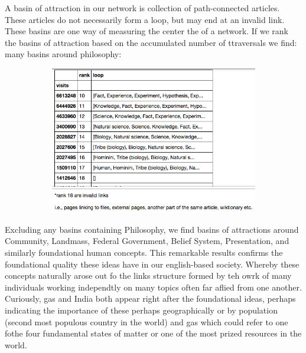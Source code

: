 \documentclass[twoside]{article}
\newcommand{\red}[1]{{\leavevmode\color{sred}{#1}}} %
\begin{document}
A basin of attraction in our network is collection of path-connected articles. These articles do not necessarily form a loop, but may end at an invalid link. These basins are one way of measuring the center the of a network. If we rank the basins of attraction based on the accumulated number of ttraversals we find: many basins around philosophy: 

\begin{figure}[H]
\centering
    \caption{Longest Path Lengths}
    \begin{subfigure}[b]{0.5\textwidth}
        \includegraphics[width=\textwidth]{graphics/top_basins.png}
    \end{subfigure}
\end{figure}

Excluding any basins containing Philosophy, we find basins of attractions around Community, 
Landmass, Federal Government, Belief System, Presentation, and similarly foundational human concepts. This remarkable results confirms the foundational quality these ideas have in our english-based society. 
Whereby these concepts naturally arose out fo the links structure formed by teh owrk of many individuals working independtly on many topics often far aflied from one another. 
Curiously, gas and India both appear right after the foundational ideas, perhaps indicating the importance of these perhaps geographically or by population (second most populous country in the world) and gas which could refer to one fothe four fundamental states of matter or one of the most prized resources in the world.

\red{((maybe add graphic))}
\end{document}
